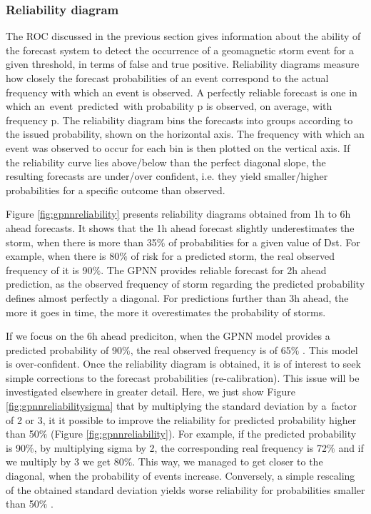 \subsubsection{Reliability diagram}


The ROC discussed in the previous section gives information about the ability of the forecast system to 
detect the occurrence of a geomagnetic storm event for a given threshold, in terms of false and true positive. 
Reliability diagrams measure how closely the forecast probabilities of an event correspond to the actual 
frequency with which an event is observed. A perfectly reliable forecast is one in which an\ event\ predicted\ 
with probability p is observed, on average, with frequency p. The reliability diagram bins the forecasts into 
groups according to the issued probability, shown on the horizontal axis. The frequency with which an event was 
observed to occur for each bin is then plotted on the vertical axis.  If the reliability curve lies above/below 
than the perfect diagonal slope, the resulting forecasts  are under/over confident, i.e. they yield  
smaller/higher probabilities for a specific outcome than observed. 


Figure \ref{fig:gpnnreliability} presents reliability diagrams obtained from 1h to 6h ahead forecasts. 
It shows that the 1h ahead forecast slightly underestimates the storm, when there is more than 35$\%$  of 
probabilities for a given value of Dst. For example, when there is 80$\%$  of risk for a predicted storm, 
the real observed frequency of it is 90$\%$. The GPNN provides reliable forecast for 2h ahead prediction, 
as the observed frequency of storm regarding the predicted probability defines almost perfectly a diagonal. 
For predictions further than 3h ahead, the more it goes in time, the more it overestimates the probability of storms. 

If we focus on the 6h ahead prediciton, when the GPNN model provides a predicted probability of 90$\%$, the 
real observed frequency is of 65$\%$ . This model is over-confident. Once the reliability diagram is obtained, 
it is of interest to seek simple corrections to the forecast probabilities (re-calibration). This issue will be 
investigated elsewhere in greater detail. Here, we just show Figure \ref{fig:gpnnreliabilitysigma} that by multiplying 
the standard deviation by a\ factor of 2 or 3, it it possible to improve the reliability for predicted probability 
higher than 50$\%$ (Figure \ref{fig:gpnnreliability}). For example, if the predicted probability is 90$\%$, 
by multiplying sigma by 2, the corresponding real frequency is 72$\%$ and if we multiply by 3 we get 80$\%$. 
This way, we managed to get closer to the diagonal, when the probability of events increase. Conversely, 
a simple rescaling of the obtained standard deviation yields worse reliability for probabilities smaller than 50$\%$ .  


